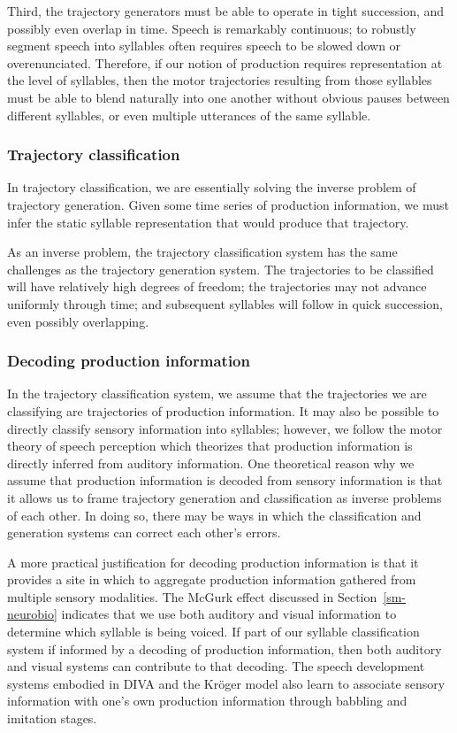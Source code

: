 Third, the trajectory generators
must be able to operate
in tight succession,
and possibly even overlap in time.
Speech is remarkably continuous;
to robustly segment speech into
syllables often requires
speech to be slowed down
or overenunciated.
Therefore, if our notion of production
requires representation at the level of syllables,
then the motor trajectories
resulting from those syllables
must be able to blend naturally into one another
without obvious pauses between
different syllables,
or even multiple utterances of the same syllable.

\subsubsection{Trajectory classification}

In trajectory classification,
we are essentially solving the inverse problem
of trajectory generation.
Given some time series of production information,
we must infer the static syllable representation
that would produce that trajectory.

As an inverse problem,
the trajectory classification system
has the same challenges
as the trajectory generation system.
The trajectories to be classified
will have relatively high degrees of freedom;
the trajectories may not advance uniformly
through time;
and subsequent syllables will follow
in quick succession,
even possibly overlapping.

\subsubsection{Decoding production information}

In the trajectory classification system,
we assume that the trajectories we are classifying
are trajectories of production information.
It may also be possible to directly classify
sensory information into syllables;
however, we follow the motor theory of speech perception
\citep{liberman1985}
which theorizes that production information
is directly inferred from auditory information.
One theoretical reason
why we assume that production information
is decoded from sensory information
is that it allows us
to frame trajectory generation and
classification as inverse problems
of each other.
In doing so, there may be ways
in which the classification and generation systems
can correct each other's errors.

A more practical justification
for decoding production information
is that it provides a site in which to
aggregate production information
gathered from multiple sensory modalities.
The McGurk effect discussed
in Section~\ref{sm-neurobio}
indicates that we use both auditory
and visual information to
determine which syllable is being voiced.
If part of our syllable classification system
if informed by a decoding of production information,
then both auditory and visual systems
can contribute to that decoding.
The speech development systems
embodied in DIVA and the Kr\"{o}ger model
also learn to associate sensory information
with one's own production information
through babbling and imitation stages.

